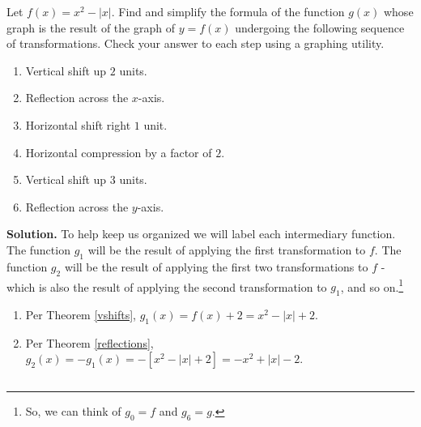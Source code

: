 \documentclass{ximera}
\begin{document}
\begin{example}  \label{graphingcalctrans} Let $f(x) = x^2 - |x|$.  Find and simplify the formula of the function $g(x)$ whose graph is the result of the graph of $y=f(x)$ undergoing the following sequence of transformations. Check your answer to each step using a graphing utility.
\begin{multicols}{2}
\begin{enumerate}

\item  Vertical shift up $2$ units.

\item  Reflection across the $x$-axis.

\item  Horizontal shift right $1$ unit.

\item  Horizontal compression by a factor of $2$.

\item  Vertical shift up $3$ units.

\item  Reflection across the $y$-axis.

\end{enumerate}
\end{multicols}

{\bf Solution.}  To help keep us organized we will label each intermediary function.  The function $g_{1}$ will be the result of applying the first transformation to $f$.  The function $g_{2}$ will be the result of applying the first two transformations to $f$ - which is also the result of applying the second transformation to $g_{1}$, and so on.\footnote{So, we can think of $g_{0} = f$ and $g_{6} = g$.}

\begin{enumerate}

\item  Per Theorem \ref{vshifts}, $g_{1}(x) = f(x) + 2 = x^2-|x|+2$.

\item  Per Theorem \ref{reflections}, $g_{2}(x) = -g_{1}(x) =  -[x^2-|x|+2] = -x^2+|x|-2$.

\begin{center}

\begin{tabular}{cc}


\end{tabular}
\end{center}
\end{enumerate}
\end{example}
\end{document}

